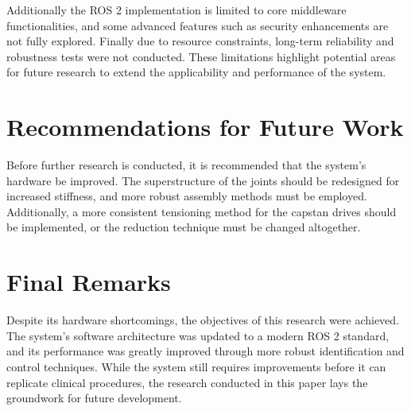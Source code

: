Additionally the ROS 2 implementation is limited to core middleware functionalities, and some advanced features such as security enhancements are not fully explored. Finally due to resource constraints, long-term reliability and robustness tests were not conducted. These limitations highlight potential areas for future research to extend the applicability and performance of the system.


\section{Recommendations for Future Work}
\label{section:future_work}

Before further research is conducted, it is recommended that the system's hardware be improved. The superstructure of the joints should be redesigned for increased stiffness, and more robust assembly methods must be employed. Additionally, a more consistent tensioning method for the capstan drives should be implemented, or the reduction technique must be changed altogether.

\section{Final Remarks}

Despite its hardware shortcomings, the objectives of this research were achieved. The system's software architecture was updated to a modern ROS 2 standard, and its performance was greatly improved through more robust identification and control techniques. While the system still requires improvements before it can replicate clinical procedures, the research conducted in this paper lays the groundwork for future development.